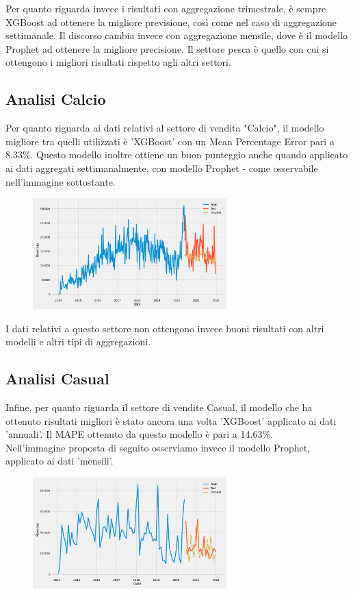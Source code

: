 \documentclass[12pt, a4paper, twocolumn]{article} %
\begin{document}
Per quanto riguarda invece i risultati con aggregazione trimestrale, è sempre XGBoost ad ottenere la migliore previsione, così come nel caso di aggregazione settimanale. Il discorso cambia invece con aggregazione mensile, dove è il modello Prophet ad ottenere la migliore precisione. Il settore pesca è quello con cui si ottengono i migliori risultati rispetto agli altri settori.

\subsection{Analisi Calcio}
Per quanto riguarda ai dati relativi al settore di vendita "Calcio", il modello migliore tra quelli utilizzati è 'XGBoost' con un Mean Percentage Error pari a 8.33\%. Questo modello inoltre ottiene un buon punteggio anche quando applicato ai dati aggregati settimanalmente, con modello Prophet - come osservabile nell'immagine sottostante.
\begin{figure}
  \caption{}
  \begin{center}
    \includegraphics[width=75mm,scale=0.5]{Calcio_settimanale_19.07}
  \end{center}
\end{figure}

I dati relativi a questo settore non ottengono invece buoni risultati con altri modelli e altri tipi di aggregazioni.

\subsection{Analisi Casual}
Infine, per quanto riguarda il settore di vendite Casual, il modello che ha ottenuto risultati migliori è stato ancora una volta 'XGBoost' applicato ai dati 'annuali'. Il MAPE ottenuto da questo modello è pari a 14.63\%.\\
Nell'immagine proposta di seguito osserviamo invece il modello Prophet, applicato ai dati 'mensili'.
\begin{figure}
  \caption{}
  \begin{center}
    \includegraphics[width=75mm,scale=0.5]{Casual_mensile_22.88}
  \end{center}
\end{figure}
\end{document}
